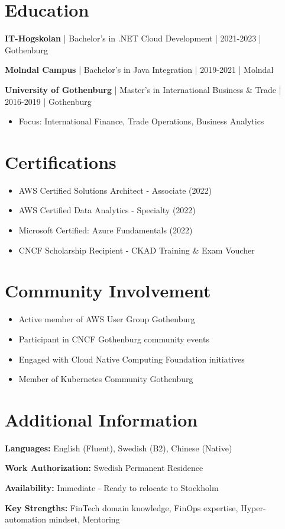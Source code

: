 \documentclass[11pt,a4paper]{article}
\begin{document}
\section*{Education}

\textbf{IT-Hogskolan} | Bachelor's in .NET Cloud Development | 2021-2023 | Gothenburg

\textbf{Molndal Campus} | Bachelor's in Java Integration | 2019-2021 | Molndal

\textbf{University of Gothenburg} | Master's in International Business \& Trade | 2016-2019 | Gothenburg
\begin{itemize}[leftmargin=*, itemsep=1pt]
\item Focus: International Finance, Trade Operations, Business Analytics
\end{itemize}

\section*{Certifications}

\begin{itemize}[leftmargin=*, itemsep=2pt]
\item AWS Certified Solutions Architect - Associate (2022)
\item AWS Certified Data Analytics - Specialty (2022)
\item Microsoft Certified: Azure Fundamentals (2022)
\item CNCF Scholarship Recipient - CKAD Training \& Exam Voucher
\end{itemize}

\section*{Community Involvement}

\begin{itemize}[leftmargin=*, itemsep=2pt]
\item Active member of AWS User Group Gothenburg
\item Participant in CNCF Gothenburg community events
\item Engaged with Cloud Native Computing Foundation initiatives
\item Member of Kubernetes Community Gothenburg
\end{itemize}

\section*{Additional Information}

\textbf{Languages:} English (Fluent), Swedish (B2), Chinese (Native)

\textbf{Work Authorization:} Swedish Permanent Residence

\textbf{Availability:} Immediate - Ready to relocate to Stockholm

\textbf{Key Strengths:} FinTech domain knowledge, FinOps expertise, Hyper-automation mindset, Mentoring
\end{document}
